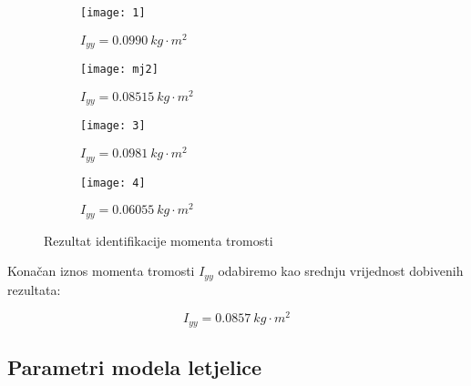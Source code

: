 \documentclass[11pt,a4paper]{article}
\begin{document}
\begin{figure}[H]
	\centering
	\begin{subfigure}{.5\textwidth}
		\centering
		\texttt{[image: 1]}
		\caption{$I_{yy} = 0.0990 \ kg \cdot m^{2}$}
		\label{fig:mj1}
	\end{subfigure}%
	\begin{subfigure}{.5\textwidth}
		\centering
		\texttt{[image: mj2]}
		\caption{$I_{yy} = 0.08515 \ kg \cdot m^{2}$}
		\label{fig:mj2}
	\end{subfigure}
	\begin{subfigure}{.5\textwidth}
		\centering
		\texttt{[image: 3]}
		\caption{$I_{yy} = 0.0981 \ kg \cdot m^{2}$}
		\label{fig:mj3}
	\end{subfigure}%
	\begin{subfigure}{.5\textwidth}
		\centering
		\texttt{[image: 4]}
		\caption{$I_{yy} = 0.06055 \ kg \cdot m^{2}$}
		\label{fig:mj4}
	\end{subfigure}
	
	\caption{Rezultat identifikacije momenta tromosti}
	\label{fig:Iyy}
\end{figure} 



Konačan iznos momenta tromosti $I_{yy}$ odabiremo kao srednju vrijednost dobivenih rezultata:

\begin{equation}
\boxed{
I_{yy} = 0.0857 \ kg \cdot m^{2}
}
\label{eq:Iyy}
\end{equation}


\newpage

\subsection{Parametri modela letjelice}
\end{document}
